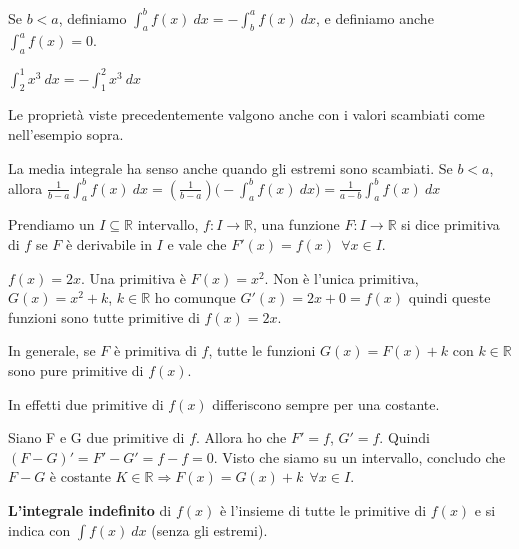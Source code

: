 \begin{observation}
Se $b<a$, definiamo $\int_a^b f(x)\:dx = - \int_b^a f(x)\:dx$, e definiamo anche $\int_a^a f(x) = 0$.
\end{observation}

\begin{example}
$\int_2^1 x^3\:dx = -\int_1^2 x^3\:dx$
\end{example}

\hspace{-15pt}Le proprietà viste precedentemente valgono anche con i valori scambiati come nell'esempio sopra.
\begin{observation}
La media integrale ha senso anche quando gli estremi sono scambiati. Se $b < a$, allora $\frac{1}{b-a}\int_a^b f(x)\:dx = (\frac{1}{b-a})\big(-\int_a^b f(x)\:dx \big) = \frac{1}{a-b}\int_a^bf(x)\:dx$
\end{observation}

\begin{definition}[Primitiva]
Prendiamo un $I\subseteq \mathbb{R}$ intervallo, $f: I \to \mathbb{R}$, una funzione $F: I \to \mathbb{R}$ si dice primitiva di $f$ se $F$ è derivabile in $I$ e vale che $F'(x) = f(x) \:\: \forall x \in I$.
\end{definition}

\begin{example}
$f(x) = 2x$. Una primitiva è $F(x) = x^2$. Non è l'unica primitiva, $G(x) = x^2 + k$, $k\in \mathbb{R}$ ho comunque $G'(x) = 2x + 0 = f(x)$ quindi queste funzioni sono tutte primitive di $f(x) = 2x$. 
\end{example}
\hspace{-15pt}In generale, se $F$ è primitiva di $f$, tutte le funzioni $G(x) = F(x) + k$ con $k \in \mathbb{R}$ sono pure primitive di $f(x)$.

\begin{observation}
In effetti due primitive di $f(x)$ differiscono sempre per una costante.
\end{observation}

\begin{demostration}
Siano F e G due primitive di $f$. Allora ho che $F' = f$, $G' = f$. Quindi $(F - G)' = F' - G' = f - f = 0$. Visto che siamo su un intervallo, concludo che $F - G$ è costante $K \in \mathbb{R} \Longrightarrow F(x) = G(x) + k \:\: \forall x \in I$.
\end{demostration}

\begin{definition}
\textbf{L'integrale indefinito} di $f(x)$ è l'insieme di tutte le primitive di $f(x)$ e si indica con $\int f(x)\:dx$ (senza gli estremi).
\end{definition}

